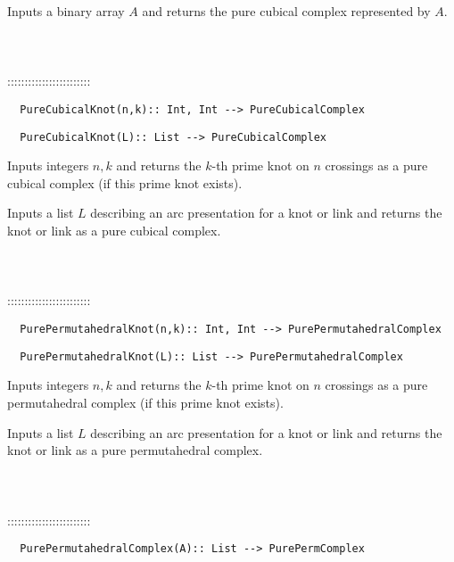 \documentclass[a4paper,11pt]{report}
\begin{document}
{ 

 Inputs a binary array $A$ and returns the pure cubical complex represented by $A$. \\
 \\
 \\
 \\
 ::::::::::::::::::::::::\\
 
\begin{verbatim}  PureCubicalKnot(n,k):: Int, Int --> PureCubicalComplex
\end{verbatim}
 
\begin{verbatim}  PureCubicalKnot(L):: List --> PureCubicalComplex
\end{verbatim}


 

 Inputs integers $n, k$ and returns the $k$-th prime knot on $n$ crossings as a pure cubical complex (if this prime knot exists). 

 Inputs a list $L$ describing an arc presentation for a knot or link and returns the knot or link
as a pure cubical complex. \\
 \\
 \\
 \\
 ::::::::::::::::::::::::\\
 
\begin{verbatim}  PurePermutahedralKnot(n,k):: Int, Int --> PurePermutahedralComplex
\end{verbatim}
 
\begin{verbatim}  PurePermutahedralKnot(L):: List --> PurePermutahedralComplex
\end{verbatim}
 

 Inputs integers $n, k$ and returns the $k$-th prime knot on $n$ crossings as a pure permutahedral complex (if this prime knot exists). 

 Inputs a list $L$ describing an arc presentation for a knot or link and returns the knot or link
as a pure permutahedral complex. \\
 \\
 \\
 \\
 ::::::::::::::::::::::::\\
 
\begin{verbatim}  PurePermutahedralComplex(A):: List --> PurePermComplex
\end{verbatim}


}
\end{document}
